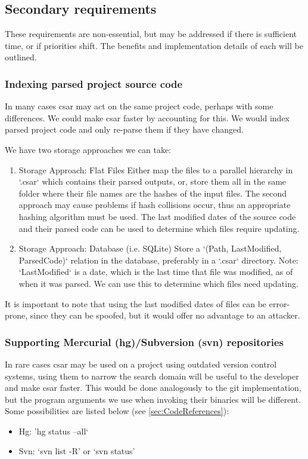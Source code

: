 \documentclass[12pt, letterpaper]{article}
\begin{document}
\subsection{Secondary requirements}
\label{sec:SecondaryRequirements}
These requirements are non-essential, but may be addressed if there is sufficient time, or if priorities shift.
The benefits and implementation details of each will be outlined.

\subsubsection{Indexing parsed project source code}
In many cases csar may act on the same project code, perhaps with some differences.
We could make csar faster by accounting for this.
We would index parsed project code and only re-parse them if they have changed.

We have two storage approaches we can take:
\begin{enumerate}
  \item Storage Approach: Flat Files\newline
  Either map the files to a parallel hierarchy in `.csar` which contains their parsed outputs, or, store them all in the same folder where their file names are the hashes of the input files.
  The second approach may cause problems if hash collisions occur, thus an appropriate hashing algorithm must be used.
  The last modified dates of the source code and their parsed code can be used to determine which files require updating.
  \item Storage Approach: Database (i.e. SQLite)\newline
  Store a `(Path, LastModified, ParsedCode)` relation in the database, preferably in a `.csar` directory.
  Note: `LastModified` is a date, which is the last time that file was modified, as of when it was parsed.
  We can use this to determine which files need updating.
\end{enumerate}

It is important to note that using the last modified dates of files can be error-prone, since they can be spoofed, but it would offer no advantage to an attacker.

\subsubsection{Supporting Mercurial (hg)/Subversion (svn) repositories}
In rare cases csar may be used on a project using outdated version control systems, using them to narrow the search domain will be useful to the developer and make csar faster.
This would be done analogously to the git implementation, but the program arguments we use when invoking their binaries will be different.
Some possibilities are listed below (see \ref{sec:CodeReferences}):
\begin{itemize}
  \item Hg: 'hg status --all`
  \item Svn: `svn list -R' or `svn status'
\end{itemize}
\end{document}
